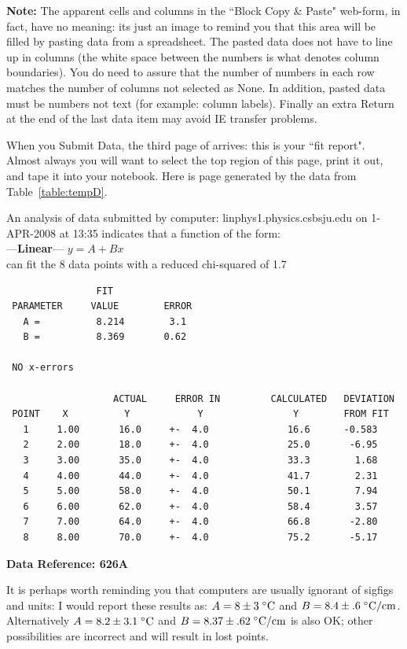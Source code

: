 {\bf Note: } The apparent cells and columns in the ``Block Copy \& Paste" web-form,
in fact, have no meaning: its just an image to remind you that this area will be
filled by pasting data from a spreadsheet.  The pasted data does not have to line up
in columns (the white space between the numbers is what denotes column boundaries).
You do need to assure  that the number of numbers in each row matches the number
of columns not selected as None.  In addition, pasted data must be numbers not text
(for example: column labels). Finally an extra Return at the end of the last
data item may avoid IE transfer problems.

When you Submit Data, the third page of \WAPP arrives: this is your
``fit report".  Almost always you will want to select the top region of this page,
print it out, and tape it into your notebook.  Here is page generated by the
data from Table~\ref{table:tempD}.

An analysis of data submitted by computer: linphys1.physics.csbsju.edu on 1-APR-2008 at 
13:35 indicates that a function of the form:\\
---{\bf Linear}--- $y=A+Bx$\\
can fit the 8 data points with a reduced chi-squared of 1.7\begin{verbatim}
                FIT
 PARAMETER     VALUE        ERROR
   A =          8.214        3.1    
   B =          8.369       0.62    
 
 NO x-errors

                   ACTUAL     ERROR IN         CALCULATED   DEVIATION
 POINT    X          Y            Y                Y        FROM FIT
   1     1.00       16.0     +-  4.0              16.6      -0.583    
   2     2.00       18.0     +-  4.0              25.0       -6.95    
   3     3.00       35.0     +-  4.0              33.3        1.68    
   4     4.00       44.0     +-  4.0              41.7        2.31    
   5     5.00       58.0     +-  4.0              50.1        7.94    
   6     6.00       62.0     +-  4.0              58.4        3.57    
   7     7.00       64.0     +-  4.0              66.8       -2.80    
   8     8.00       70.0     +-  4.0              75.2       -5.17    \end{verbatim}
{\small \bf Data Reference: 626A}

It is perhaps worth reminding you that computers are usually ignorant of sigfigs
and units:
I would report these results as: $A=8\pm3\;{}^{\circ}{\rm C}$ and
$B=8.4\pm.6\;{}^{\circ}{\rm C/cm}$. Alternatively $A=8.2\pm3.1\;{}^{\circ}{\rm C}$ and
$B=8.37\pm.62\;{}^{\circ}{\rm C/cm}$ is also OK; other possibilities are incorrect
and will result in lost points.

